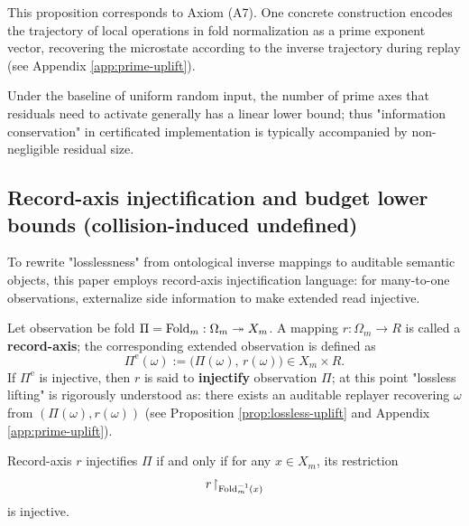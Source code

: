 This proposition corresponds to Axiom (A7). One concrete construction encodes the trajectory of local operations in fold normalization as a prime exponent vector, recovering the microstate according to the inverse trajectory during replay (see Appendix \ref{app:prime-uplift}).\par

\begin{remark}
Under the baseline of uniform random input, the number of prime axes that residuals need to activate generally has a linear lower bound; thus "information conservation" in certificated implementation is typically accompanied by non-negligible residual size.\par
\end{remark}

\subsection{Record-axis injectification and budget lower bounds (collision-induced undefined)}\label{subsec:injectivization-budget}
To rewrite "losslessness" from ontological inverse mappings to auditable semantic objects, this paper employs record-axis injectification language: for many-to-one observations, externalize side information to make extended read injective.\par

\begin{definition}\label{def:record-axis-injectivization}
Let observation be fold $\Pi=\mathrm{Fold}_m:\Omega_m\twoheadrightarrow X_m$. A mapping $r:\Omega_m\to R$ is called a \textbf{record-axis}; the corresponding extended observation is defined as
$$
\Pi^{\mathrm e}(\omega):=\bigl(\Pi(\omega),\,r(\omega)\bigr)\in X_m\times R.
$$
If $\Pi^{\mathrm e}$ is injective, then $r$ is said to \textbf{injectify} observation $\Pi$; at this point "lossless lifting" is rigorously understood as: there exists an auditable replayer recovering $\omega$ from $(\Pi(\omega),r(\omega))$ (see Proposition \ref{prop:lossless-uplift} and Appendix \ref{app:prime-uplift}).\par
\end{definition}

\begin{proposition}\label{prop:injectivization-fiber-criterion}
Record-axis $r$ injectifies $\Pi$ if and only if for any $x\in X_m$, its restriction
$$
r\!\restriction_{\mathrm{Fold}_m^{-1}(x)}
$$
is injective.\par
\end{proposition}

